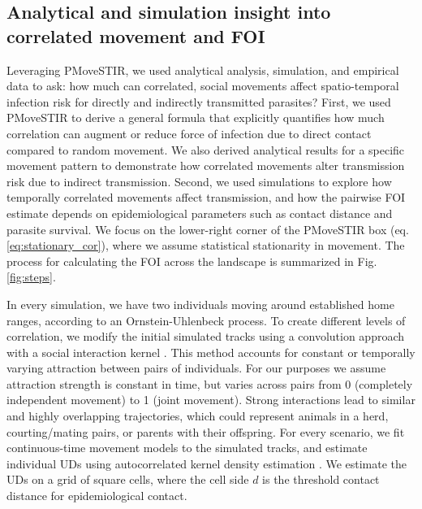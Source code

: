 \documentclass[letterpaper]{article}
\begin{document}
\subsection*{Analytical and simulation insight into correlated movement and FOI}

Leveraging PMoveSTIR, we used analytical analysis, simulation, and empirical data to ask: how much can correlated, social movements affect spatio-temporal infection risk for directly and indirectly transmitted parasites? 
First, we used PMoveSTIR to derive a general formula that explicitly quantifies how much correlation can augment or reduce force of infection due to direct contact compared to random movement. We also derived analytical results for a specific movement pattern to demonstrate how correlated movements alter transmission risk due to indirect transmission.
Second, we used simulations to explore how temporally correlated movements affect  transmission, and how the pairwise FOI estimate depends on epidemiological parameters such as contact distance and parasite survival. We focus on the lower-right corner of the PMoveSTIR box (eq. \ref{eq:stationary_cor}), where we assume statistical stationarity in movement. The process for calculating the FOI across the landscape is summarized in Fig. \ref{fig:steps}.

In every simulation, we have two individuals moving around established home ranges, according to an Ornstein-Uhlenbeck process. To create different levels of correlation, we modify the initial simulated tracks using a convolution approach with a social interaction kernel \citep{Scharf2018}. This method accounts for constant or temporally varying attraction between pairs of individuals. For our purposes we assume attraction strength is constant in time, but varies across pairs from 0 (completely independent movement) to 1 (joint movement). Strong interactions lead to similar and highly overlapping trajectories, which could represent animals in a herd, courting/mating pairs, or parents with their offspring.
For every scenario, we fit continuous-time movement models to the simulated tracks, and estimate individual UDs using autocorrelated kernel density estimation \citep{Calabrese2016}. We estimate the UDs on a grid of square cells, where the cell side $d$ is the threshold contact distance for epidemiological contact. 
\end{document}
